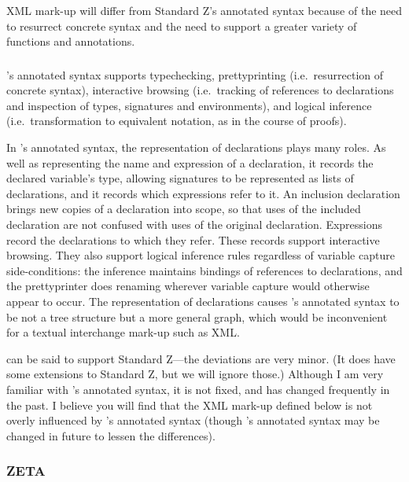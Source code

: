 \documentclass[a4paper,10pt]{article}
\def\Zeta{{\sf Z{\small E}T{\small A}}}
\begin{document}
XML mark-up will differ from Standard Z's annotated syntax
because of the need to resurrect concrete syntax
and the need to support a greater variety of functions and annotations.

\subsubsection{\CADiZ}

\CADiZ's annotated syntax supports typechecking,
prettyprinting (i.e.\ resurrection of concrete syntax),
interactive browsing (i.e.\ tracking of references to declarations
and inspection of types, signatures and environments),
and logical inference (i.e.\ transformation to equivalent notation,
as in the course of proofs).

In \CADiZ's annotated syntax,
the representation of declarations plays many roles.
As well as representing the name and expression of a declaration,
it records the declared variable's type,
allowing signatures to be represented as lists of declarations,
and it records which expressions refer to it.
An inclusion declaration brings new copies of a declaration into scope,
so that uses of the included declaration are not
confused with uses of the original declaration.
Expressions record the declarations to which they refer.
These records support interactive browsing.
They also support logical inference rules
regardless of variable capture side-conditions:
the inference maintains bindings of references to declarations,
and the prettyprinter does renaming
wherever variable capture would otherwise appear to occur.
The representation of declarations causes \CADiZ's annotated syntax
to be not a tree structure but a more general graph,
which would be inconvenient for a textual interchange mark-up such as XML.

\CADiZ\cite{CADiZ} can be said to support Standard Z---the deviations
are very minor.
(It does have some extensions to Standard Z, but we will ignore those.)
Although I am very familiar with \CADiZ's annotated syntax,
it is not fixed, and has changed frequently in the past.
I believe you will find that the XML mark-up defined below
is not overly influenced by \CADiZ's annotated syntax
(though \CADiZ's annotated syntax may be changed in future
to lessen the differences).

\subsubsection{\Zeta}
\end{document}
